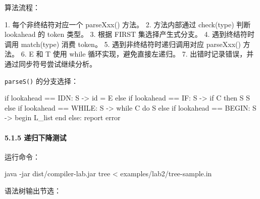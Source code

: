 \documentclass[
  a4paper,
  fontset=none,
]{ctexart}
\newenvironment{Shaded}{}{}
\newcommand{\AttributeTok}[1]{\textcolor[rgb]{0.49,0.56,0.16}{#1}}
\newcommand{\ExtensionTok}[1]{#1}
\newcommand{\NormalTok}[1]{#1}
\newcommand{\OperatorTok}[1]{\textcolor[rgb]{0.40,0.40,0.40}{#1}}
\begin{document}
算法流程：

\begin{Shaded}
\begin{Highlighting}[]
\NormalTok{1. 每个非终结符对应一个 parseXxx() 方法。}
\NormalTok{2. 方法内部通过 check(type) 判断 lookahead 的 token 类型。}
\NormalTok{3. 根据 FIRST 集选择产生式分支。}
\NormalTok{4. 遇到终结符时调用 match(type) 消费 token。}
\NormalTok{5. 遇到非终结符时递归调用对应 parseXxx() 方法。}
\NormalTok{6. E\textquotesingle{} 和 T\textquotesingle{} 使用 while 循环实现，避免直接左递归。}
\NormalTok{7. 出错时记录错误，并通过同步符号尝试继续分析。}
\end{Highlighting}
\end{Shaded}

\texttt{parseS()} 的分支选择：

\begin{Shaded}
\begin{Highlighting}[]
\NormalTok{if lookahead == IDN:}
\NormalTok{    S {-}\textgreater{} id = E}
\NormalTok{else if lookahead == IF:}
\NormalTok{    S {-}\textgreater{} if C then S S\textquotesingle{}}
\NormalTok{else if lookahead == WHILE:}
\NormalTok{    S {-}\textgreater{} while C do S}
\NormalTok{else if lookahead == BEGIN:}
\NormalTok{    S {-}\textgreater{} begin L\_list end}
\NormalTok{else:}
\NormalTok{    report error}
\end{Highlighting}
\end{Shaded}

\hypertarget{ux9012ux5f52ux4e0bux964dux6d4bux8bd5}{%
\paragraph{5.1.5
递归下降测试}\label{ux9012ux5f52ux4e0bux964dux6d4bux8bd5}}

运行命令：

\begin{Shaded}
\begin{Highlighting}[]
\ExtensionTok{java} \AttributeTok{{-}jar}\NormalTok{ dist/compiler{-}lab.jar tree }\OperatorTok{\textless{}}\NormalTok{ examples/lab2/tree{-}sample.in}
\end{Highlighting}
\end{Shaded}

语法树输出节选：
\end{document}
